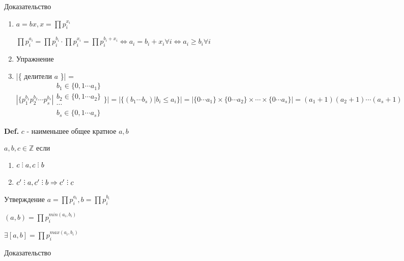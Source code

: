 \documentclass[14pt, letter paper]{article}
\DeclareRobustCommand{\divby}{%
  \mathrel{\text{\vbox{\baselineskip.65ex\lineskiplimit0pt\hbox{.}\hbox{.}\hbox{.}}}}%
}
\begin{document}
\begin{center}
    Доказательство
\end{center}

\begin{enumerate}
    \item $a = bx, x = \prod p_i^{x_i}$

    $\prod p_i^{a_i} = \prod p_i^{b_i} \cdot \prod p_i^{x_i} = \prod p_i^{b_i + x_i} \Leftrightarrow a_i = b_i + x_i \forall i \Leftrightarrow a_i \geq b_i \forall i$

    \item Упражнение

    \item |\{ делители $a$ \}| = $|\{ p_1^{b_1} p_2^{b_2} \cdots p_s^{b_s} | \begin{gathered} b_1 \in \{ 0, 1 \cdots a_1\} \\ b_2 \in \{ 0, 1 \cdots a_2 \} \\ \cdots \\ b_s \in \{ 0, 1 \cdots a_s \} \end{gathered} \}| = |\{(b_1 \cdots b_s) | b_i \leq a_i \}| = |\{0 \cdots a_1\} \times \{ 0 \cdots a_2 \} \times \cdots \times \{ 0 \cdots a_s \}| = (a_1 + 1)(a_2 + 1) \cdots (a_s + 1)$
\end{enumerate}

\textbf{Def.} $c$ - наименьшее общее кратное $a, b$

$a, b, c \in \mathds{Z}$ если 

\begin{enumerate}
    \item $c \divby a, c \divby b$
    \item $c' \divby a, c' \divby b \Rightarrow c' \divby c$
\end{enumerate}

Утверждение $a = \prod p_i^{a_i}, b = \prod p_i^{b_i}$

$(a, b) = \prod p_i^{min(a_i, b_i)}$

$\exists [a, b] = \prod p_i^{max(a_i, b_i)}$

\begin{center}
    Доказательство
\end{center}
\end{document}
